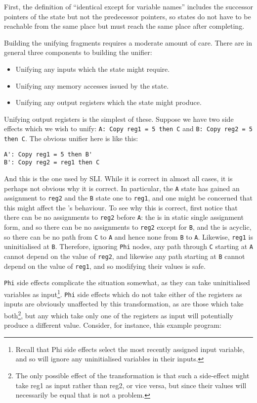 First, the definition of ``identical except for variable names''
includes the successor pointers of the state but not the predecessor
pointers, so states do not have to be reachable from the same place
but must reach the same place after completing.

Building the unifying \StateMachine fragments requires a moderate
amount of care.  There are in general three components to building the
unifier:

\begin{itemize}
\item
  Unifying any inputs which the state might require.
\item
  Unifying any memory accesses issued by the state.
\item
  Unifying any output registers which the state might produce.
\end{itemize}

Unifying output registers is the simplest of these.  Suppose we have
two side effects which we wish to unify:
\verb|A: Copy reg1 = 5 then C| and \verb|B: Copy reg2 = 5 then C|.
The obvious unifier here is like this:

\begin{verbatim}
A': Copy reg1 = 5 then B'
B': Copy reg2 = reg1 then C
\end{verbatim}

And this is the one used by SLI.  While it is correct in almost all
cases, it is perhaps not obvious why it is correct.  In particular,
the \verb|A| state has gained an assignment to \verb|reg2| and the
\verb|B| state one to \verb|reg1|, and one might be concerned that
this might affect the \StateMachine's behaviour.  To see why this is
correct, first notice that there can be no assignments to \verb|reg2|
before \verb|A|: the \StateMachine is in static single assignment
form, and so there can be no assignments to \verb|reg2| except for
\verb|B|, and the \StateMachine is acyclic, so there can be no path
from \verb|C| to \verb|A| and hence none from \verb|B| to \verb|A|.
Likewise, \verb|reg1| is uninitialised at \verb|B|.  Therefore,
ignoring \verb|Phi| nodes, any path through \verb|C| starting at
\verb|A| cannot depend on the value of \verb|reg2|, and likewise any
path starting at \verb|B| cannot depend on the value of \verb|reg1|,
and so modifying their values is safe.

\verb|Phi| side effects complicate the situation somewhat, as they can
take uninitialised variables as input\footnote{Recall that Phi side
  effects select the most recently assigned input variable, and so
  will ignore any uninitialised variables in their inputs.}.
\verb|Phi| side effects which do not take either of the registers as
inputs are obviously unaffected by this transformation, as are those
which take both\footnote{The only possible effect of the
  transformation is that such a side-effect might take reg1 as input
  rather than reg2, or vice versa, but since their values will
  necessarily be equal that is not a problem.}, but any which take
only one of the registers as input will potentially produce a
different value.  Consider, for instance, this example program:

